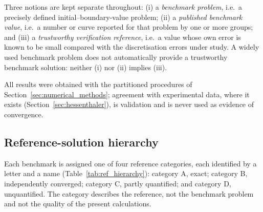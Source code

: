 Three notions are kept separate throughout:
(i) a \emph{benchmark problem}, i.e.\ a precisely defined initial--boundary-value problem;
(ii) a \emph{published benchmark value}, i.e.\ a number or curve reported for that problem by one or more groups; and
(iii) a \emph{trustworthy verification reference}, i.e.\ a value whose own error is known to be small compared with the discretisation errors under study.
A widely used benchmark problem does not automatically provide a trustworthy benchmark solution: neither (i) nor (ii) implies (iii).

All results were obtained with the partitioned procedures of Section~\ref{sec:numerical_methods}; agreement with experimental data, where it exists (Section~\ref{sec:hessenthaler}), is validation and is never used as evidence of convergence.

\subsection{Reference-solution hierarchy}\label{sec:ref_hierarchy}

Each benchmark is assigned one of four reference categories, each identified by a letter and a name (Table~\ref{tab:ref_hierarchy}): category A, exact; category B, independently converged; category C, partly quantified; and category D, unquantified.
The category describes the reference, not the benchmark problem and not the quality of the present calculations.

